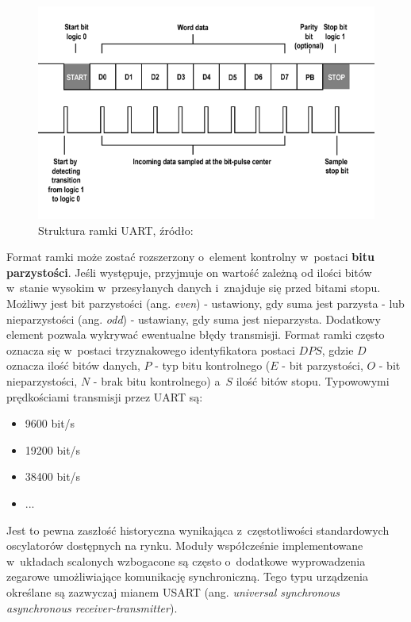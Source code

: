 \begin{figure}
    \centering
    \includegraphics[scale=0.5]{img/uart_frame.png}
    \captionsetup{format=plain,justification=centering}
    \caption{Struktura ramki UART, źródło: \cite{uart_frame}}
    \label{UART}
\end{figure}

Format ramki może zostać rozszerzony o~element kontrolny w~postaci \textbf{bitu parzystości}. Jeśli występuje, przyjmuje on wartość zależną od ilości bitów w~stanie wysokim w~przesyłanych danych i~znajduje się przed bitami stopu. Możliwy jest bit parzystości (ang. \textit{even}) - ustawiony, gdy suma jest parzysta - lub nieparzystości (ang. \textit{odd}) - ustawiany, gdy suma jest nieparzysta. Dodatkowy element pozwala wykrywać ewentualne błędy transmisji. Format ramki często oznacza się w~postaci trzyznakowego identyfikatora postaci $DPS$, gdzie $D$ oznacza ilość bitów danych, $P$ - typ bitu kontrolnego ($E$ - bit parzystości, $O$ - bit nieparzystości, $N$ - brak bitu kontrolnego) a~$S$ ilość bitów stopu. Typowowymi prędkościami transmisji przez UART są:

\begin{itemize}
    \item 9600 bit/s
    \item 19200 bit/s
    \item 38400 bit/s
    \item ...
\end{itemize}

Jest to pewna zaszłość historyczna wynikająca z~częstotliwości standardowych oscylatorów dostępnych na rynku. Moduły współcześnie implementowane w~układach scalonych wzbogacone są często o~dodatkowe wyprowadzenia zegarowe umożliwiające komunikację synchroniczną. Tego typu urządzenia określane są zazwyczaj mianem USART (ang. \textit{universal synchronous asynchronous receiver-transmitter}).
